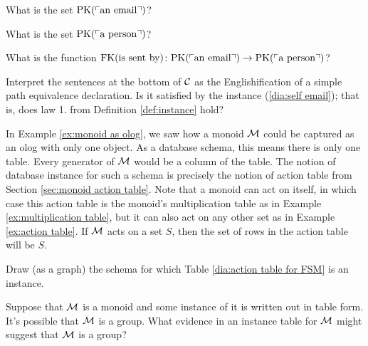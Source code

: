 \documentclass[CT4S-EN-RU]{subfiles}
\begin{document}
\begin{exerciseENG}
\sexc What is the set $\textnormal{PK}(\textnormal{$\ulcorner$an email$\urcorner$})$? 
\item What is the set $\textnormal{PK}(\textnormal{$\ulcorner$a person$\urcorner$})$? 
\item What is the function $\textnormal{FK}(\textnormal{is sent by})\colon\textnormal{PK}(\textnormal{$\ulcorner$an email$\urcorner$})\rightarrow\textnormal{PK}(\textnormal{$\ulcorner$a person$\urcorner$})$?
\item Interpret the sentences at the bottom of $\mathcal{C}$ as the Englishification of a simple path equivalence declaration. Is it satisfied by the instance (\ref{dia:self email}); that is, does law 1. from Definition \ref{def:instance} hold?
\endsexc
\end{exerciseENG}

\begin{exerciseRUS}\label{ex:self email}
\end{exerciseRUS}

\begin{exampleENG}\label{ex:monoid action table}
In Example \ref{ex:monoid as olog}, we saw how a monoid $\mathcal{M}$ could be captured as an olog with only one object. As a database schema, this means there is only one table. Every generator of $\mathcal{M}$ would be a column of the table. The notion of database instance for such a schema is precisely the notion of action table from Section \ref{sec:monoid action table}. Note that a monoid can act on itself, in which case this action table is the monoid's multiplication table as in Example \ref{ex:multiplication table}, but it can also act on any other set as in Example \ref{ex:action table}. If $\mathcal{M}$ acts on a set $S$, then the set of rows in the action table will be $S$.
\end{exampleENG}

\begin{exampleRUS}\label{ex:monoid action table}
\end{exampleRUS}

\begin{exerciseENG}
Draw (as a graph) the schema for which Table \ref{dia:action table for FSM} is an instance.
\end{exerciseENG}

\begin{exerciseRUS}
\end{exerciseRUS}

\begin{exerciseENG}
Suppose that $\mathcal{M}$ is a monoid and some instance of it is written out in table form. It's possible that $\mathcal{M}$ is a group. What evidence in an instance table for $\mathcal{M}$ might suggest that $\mathcal{M}$ is a group? 
\end{exerciseENG}
\end{document}
